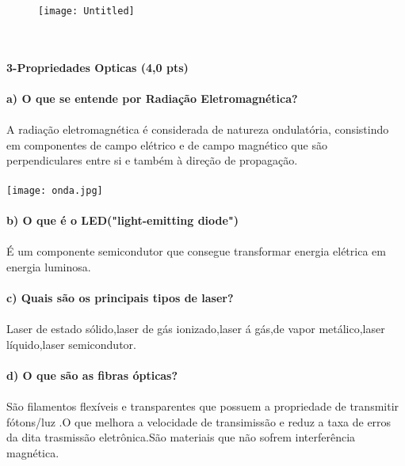 \documentclass[11pt,a4paper]{article}
\begin{document}
\begin{figure}[!htb]
\texttt{[image: Untitled]}
\end{figure}
\\\\
\textbf{3-Propriedades Opticas (4,0 pts)}\\\\
\textbf{a) O que se entende por Radiação Eletromagnética?}\\\\
A radiação eletromagnética é considerada de natureza ondulatória, consistindo em componentes de campo elétrico e de campo magnético que são perpendiculares entre si e também à direção de propagação.\\\\
\texttt{[image: onda.jpg]}
\\\\
\textbf{b) O que é o LED("light-emitting diode")}\\\\
É um componente semicondutor que consegue transformar energia elétrica em energia luminosa.
\\\\
\textbf{c) Quais são os principais tipos de laser?}\\\\
Laser de estado sólido,laser de gás ionizado,laser á gás,de vapor metálico,laser líquido,laser semicondutor.
\\\\
\textbf{d) O que são as fibras ópticas?}\\\\
São filamentos flexíveis e transparentes que possuem a propriedade de transmitir fótons/luz .O que melhora a velocidade de transimissão e reduz a taxa de erros da dita trasmissão eletrônica.São materiais que não sofrem interferência magnética.
\\\\
\end{document}
